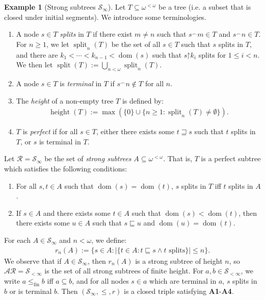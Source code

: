 \documentclass[11pt,reqno]{amsart}
\theoremstyle{plain}
\numberwithin{equation}{section}
\theoremstyle{definition}
\newtheorem{example}[theorem]{Example}
\newcommand{\func}{\operatorname}
\newcommand{\cal}{\mathcal}
\newcommand{\dom}{\func{dom}}
\newcommand{\restrictedto}{\mathord{\upharpoonright}}
\newcommand{\fin}{\mathrm{fin}}
\newcommand{\height}{\func{height}}
\renewcommand{\S}{\mathcal{S}}
\begin{document}
\begin{example}[Strong subtrees $\S_\infty$]
\label{ex:strong.subtrees}
    Let $T \subseteq \omega^{<\omega}$ be a tree (i.e. a subset that is closed under initial segments). We introduce some terminologies.
    \begin{enumerate}
        \item A node $s \in T$ \emph{splits} in $T$ if there exist $m \neq n$ such that $s^\frown m \in T$ and $s^\frown n \in T$. For $n \geq 1$, we let $\func{split}_n(T)$ be the set of all $s \in T$ such that $s$ splits in $T$, and there are $k_1 < \cdots < k_{n-1} < \dom(s)$ such that $s\restrictedto k_i$ splits for $1 \leq i < n$. We then let $\func{split}(T) := \bigcup_{n<\omega}\func{split}_n(T)$.

        \item A node $s \in T$ is \emph{terminal} in $T$ if $s^\frown n \notin T$ for all $n$.

        \item The \emph{height} of a non-empty tree $T$ is defined by:
        \begin{align*}
            \height(T) := \max(\{0\} \cup \{n \geq 1 : \func{split}_n(T) \neq \emptyset\}).
        \end{align*}

        \item $T$ is \emph{perfect} if for all $s \in T$, either there exists some $t \sqsupseteq s$ such that $t$ splits in $T$, or $s$ is terminal in $T$.
    \end{enumerate}
    Let $\cal{R} = \S_\infty$ be the set of \emph{strong subtrees} $A \subseteq \omega^{<\omega}$. That is, $T$ is a perfect subtree which satisfies the following conditions:
    \begin{enumerate}
        \item For all $s,t \in A$ such that $\dom(s) = \dom(t)$, $s$ splits in $T$ iff $t$ splits in $A$.

        \item If $s \in A$ and there exists some $t \in A$ such that $\dom(s) < \dom(t)$, then there exists some $u \in A$ such that $s \sqsubseteq u$ and $\dom(u) = \dom(t)$.
    \end{enumerate}
    For each $A \in \S_\infty$ and $n < \omega$, we define:
    \begin{align*}
        r_n(A) := \{s \in A : |\{t \in A : t \sqsubseteq s \wedge t \text{ splits}\}| \leq n\}.
    \end{align*}
    We observe that if $A \in \S_\infty$, then $r_n(A)$ is a strong subtree of height $n$, so $\cal{AR} = \S_{<\infty}$ is the set of all strong subtrees of finite height. For $a,b \in \S_{<\infty}$, we write $a \leq_\fin b$ iff $a \subseteq b$, and for all nodes $s \in a$ which are terminal in $a$, $s$ splits in $b$ or is terminal $b$. Then $(\S_\infty,\leq,r)$ is a closed triple satisfying \textbf{A1}-\textbf{A4}.
    

\end{example}
\end{document}
